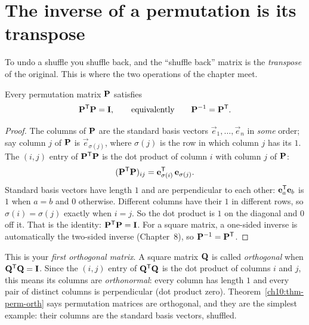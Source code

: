 \section{The inverse of a permutation is its transpose}

To undo a shuffle you shuffle back, and the ``shuffle back'' matrix is the \emph{transpose} of the
original. This is where the two operations of the chapter meet.

\begin{theorem}\label{ch10:thm-perm-orth}
Every permutation matrix $\mathbf{P}$ satisfies
\[
  \mathbf{P}^{\mathsf{T}}\mathbf{P} = \mathbf{I},
  \qquad\text{equivalently}\qquad
  \mathbf{P}^{-1} = \mathbf{P}^{\mathsf{T}}.
\]
\end{theorem}

\begin{proof}
The columns of $\mathbf{P}$ are the standard basis vectors $\vec{e}_1,\dots,\vec{e}_n$ in \emph{some}
order; say column $j$ of $\mathbf{P}$ is $\vec{e}_{\sigma(j)}$, where $\sigma(j)$ is the row in which
column $j$ has its $1$. The $(i,j)$ entry of $\mathbf{P}^{\mathsf{T}}\mathbf{P}$ is the dot product of column $i$
with column $j$ of $\mathbf{P}$:
\[
  (\mathbf{P}^{\mathsf{T}}\mathbf{P})_{ij} = \mathbf{e}_{\sigma(i)}^{\mathsf{T}}\,\mathbf{e}_{\sigma(j)}.
\]
Standard basis vectors have length $1$ and are perpendicular to each other: $\mathbf{e}_a^{\mathsf{T}}\mathbf{e}_b$
is $1$ when $a=b$ and $0$ otherwise. Different columns have their $1$ in different rows, so
$\sigma(i)=\sigma(j)$ exactly when $i=j$. So the dot product is $1$ on the diagonal and $0$ off
it. That is the identity: $\mathbf{P}^{\mathsf{T}}\mathbf{P}=\mathbf{I}$. For a square matrix, a one-sided inverse is
automatically the two-sided inverse (Chapter~8), so $\mathbf{P}^{-1}=\mathbf{P}^{\mathsf{T}}$.
\end{proof}

This is your \emph{first orthogonal matrix}. A square matrix $\mathbf{Q}$ is called \emph{orthogonal} when
$\mathbf{Q}^{\mathsf{T}}\mathbf{Q}=\mathbf{I}$. Since the $(i,j)$ entry of $\mathbf{Q}^{\mathsf{T}}\mathbf{Q}$ is the dot product of
columns $i$ and $j$, this means its columns are \emph{orthonormal}: every column has length $1$
and every pair of distinct columns is perpendicular (dot product zero).
Theorem~\ref{ch10:thm-perm-orth} says
permutation matrices are orthogonal, and they are the simplest example: their columns are
the standard basis vectors, shuffled.

